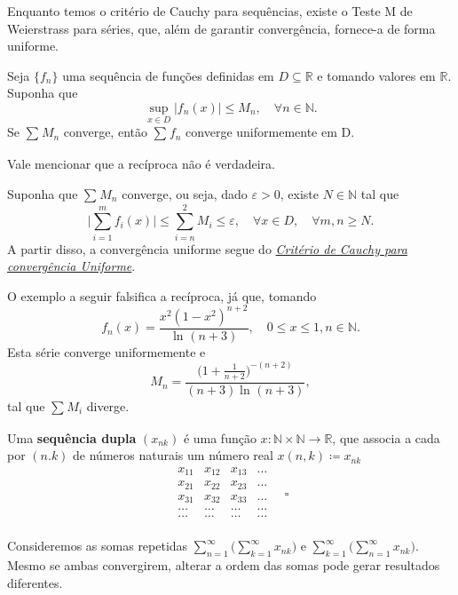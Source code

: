\documentclass[../analysis_notes.tex]{subfiles}
\begin{document}
Enquanto temos o critério de Cauchy para sequências, existe o Teste M de Weierstrass para séries, que, além de garantir convergência, fornece-a de forma uniforme.
\hypertarget{weierstrass_m}{
	\begin{theorem*}
		Seja \(\{f_{n}\}\) uma sequência de funções definidas em \(D\subseteq \mathbb{R}\) e tomando valores em \(\mathbb{R}\). Suponha que
		\[
			\sup_{x\in D}|f_{n}(x)|\leq M_{n},\quad \forall n\in \mathbb{N}.
		\]
		Se \(\sum\limits_{}^{}M_{n}\) converge, então \(\sum\limits_{}^{}f_{n}\) converge uniformemente em D.
	\end{theorem*}
}
Vale mencionar que a recíproca não é verdadeira.
\begin{proof*}
	Suponha que \(\sum\limits_{}^{}M_{n}\) converge, ou seja, dado \(\varepsilon >0\), existe \(N\in \mathbb{N}\) tal que
	\[
		\biggl\vert \sum\limits_{i=1}^{m}f_{i}(x) \biggr\vert\leq \sum\limits_{i=n}^{2}M_{i}\leq \varepsilon , \quad \forall x\in D, \quad \forall m, n\geq N.
	\]
	A partir disso, a convergência uniforme segue do \hyperlink{uniform_cauchy}{\textit{Critério de Cauchy para convergência Uniforme}}. \qedsymbol
\end{proof*}
\begin{example}
	O exemplo a seguir falsifica a recíproca, já que, tomando
	\[
		f_{n}(x)=\frac{x^{2}(1-x^{2})^{n+2}}{\ln^{}{(n+3)}},\quad 0\leq x\leq 1, n\in \mathbb{N}.
	\]
	Esta série converge uniformemente e
	\[
		M_{n}=\frac{\biggl(1+\frac{1}{n+2}\biggr)^{-(n+2)}}{(n+3)\ln^{}{(n+3)}},
	\]
	tal que \(\sum\limits_{}^{}M_{i}\) diverge.
\end{example}
\begin{def*}
	Uma \textbf{sequência dupla} \((x_{nk})\) é uma função \(x:\mathbb{N}\times \mathbb{N}\rightarrow \mathbb{R} \), que associa a cada por \((n. k)\) de números naturais um número real \(x(n, k)\coloneqq x_{nk}\)
	\[
		\begin{matrix}
			x_{11} & x_{12} & x_{13} & \dotsc \\
			x_{21} & x_{22} & x_{23} & \dotsc \\
			x_{31} & x_{32} & x_{33} & \dotsc \\
			\dotsc & \dotsc & \dotsc & \dotsc \\
			\dotsc & \dotsc & \dotsc & \dotsc \\
		\end{matrix}\quad \square
	\]
\end{def*}
Consideremos as somas repetidas \(\sum\limits_{n=1}^{\infty}\biggl(\sum\limits_{k=1}^{\infty}x_{nk}\biggr)\) e \(\sum\limits_{k=1}^{\infty}\biggl(\sum\limits_{n=1}^{\infty}x_{nk}\biggr)\). Mesmo se ambas convergirem, alterar a ordem das somas pode gerar resultados diferentes.
\end{document}
